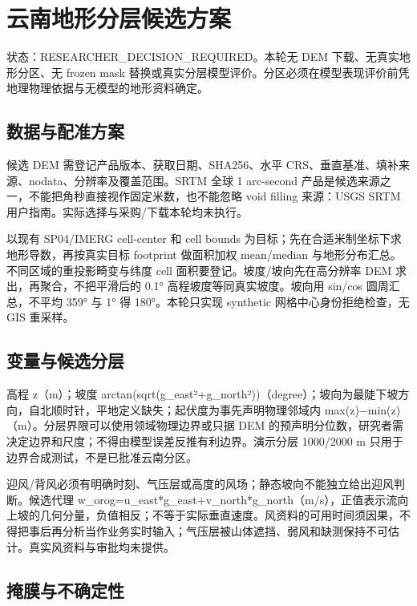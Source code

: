 \documentclass[UTF8,a4paper,10pt,fontset=fandol]{ctexart}
\begin{document}
\clearpage
\section*{云南地形分层候选方案}

状态：RESEARCHER\_DECISION\_REQUIRED。本轮无 DEM 下载、无真实地形分区、无 frozen mask 替换或真实分层模型评价。分区必须在模型表现评价前凭地理物理依据与无模型的地形资料确定。\par

\subsection*{数据与配准方案}

候选 DEM 需登记产品版本、获取日期、SHA256、水平 CRS、垂直基准、填补来源、nodata、分辨率及覆盖范围。SRTM 全球 1 arc-second 产品是候选来源之一，不能把角秒直接视作固定米数，也不能忽略 void filling 来源：USGS SRTM 用户指南。实际选择与采购/下载本轮均未执行。\par

以现有 SP04/IMERG cell-center 和 cell bounds 为目标；先在合适米制坐标下求地形导数，再按真实目标 footprint 做面积加权 mean/median 与地形分布汇总。不同区域的重投影畸变与纬度 cell 面积要登记。坡度/坡向先在高分辨率 DEM 求出，再聚合，不把平滑后的 0.1° 高程坡度等同真实坡度。坡向用 sin/cos 圆周汇总，不平均 359° 与 1° 得 180°。本轮只实现 synthetic 网格中心身份拒绝检查，无 GIS 重采样。\par

\subsection*{变量与候选分层}

高程 z（m）；坡度 arctan(sqrt(g\_east²+g\_north²))（degree）；坡向为最陡下坡方向，自北顺时针，平地定义缺失；起伏度为事先声明物理邻域内 max(z)−min(z)（m）。分层界限可以使用领域物理边界或只据 DEM 的预声明分位数，研究者需决定边界和尺度；不得由模型误差反推有利边界。演示分层 1000/2000 m 只用于边界合成测试，不是已批准云南分区。\par

迎风/背风必须有明确时刻、气压层或高度的风场；静态坡向不能独立给出迎风判断。候选代理 w\_orog=u\_east*g\_east+v\_north*g\_north（m/s），正值表示流向上坡的几何分量，负值相反；不等于实际垂直速度。风资料的可用时间须因果，不得把事后再分析当作业务实时输入；气压层被山体遮挡、弱风和缺测保持不可估计。真实风资料与审批均未提供。\par

\subsection*{掩膜与不确定性}
\end{document}
